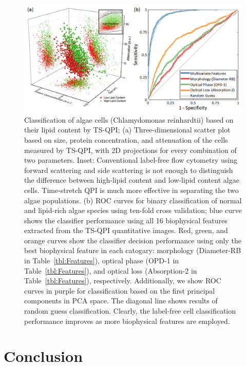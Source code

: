 \documentclass[aps,pra,reprint,superscriptaddress]{revtex4-1}
\begin{document}
\begin{figure}
\includegraphics[scale=0.2]{FigureAlgae.jpg}
\caption{\label{fig:AlgaeScatter} Classification of algae cells (Chlamydomonas reinhardtii) based on their lipid content by TS-QPI; (a) Three-dimensional scatter plot based on size, protein concentration, and attenuation of the cells measured by TS-QPI, with 2D projections for every combination of two parameters. Inset: Conventional label-free flow cytometry using forward scattering and side scattering is not enough to distinguish the difference between high-lipid content and low-lipid content algae cells. Time-stretch QPI is much more effective in separating the two algae populations. (b) ROC curves for binary classification of normal and lipid-rich algae species using ten-fold cross validation; blue curve shows the classifier performance using all 16 biophysical features extracted from the TS-QPI quantitative images. Red, green, and orange curves show the classifier decision performance using only the best biophysical feature in each catogary: morphology (Diameter-RB in Table~\ref{tbl:Features}), optical phase (OPD-1 in Table~\ref{tbl:Features}), and optical loss (Absorption-2 in Table~\ref{tbl:Features}), respectively. Additionally, we show ROC curves in purple for classification based on the first principal components in PCA space. The diagonal line shows results of random guess classification. Clearly, the label-free cell classification performance improves as more biophysical features are employed.}
\end{figure}

\section{Conclusion}
\end{document}
